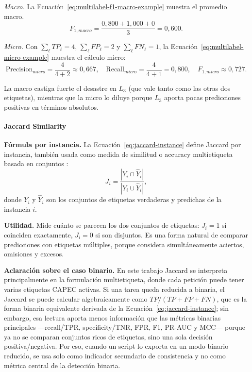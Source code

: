 \documentclass[12pt,oneside]{report}
\begin{document}
\emph{Macro.} La Ecuación~\eqref{eq:multilabel-f1-macro-example} muestra el promedio macro.
\begin{equation}
\label{eq:multilabel-f1-macro-example}
F_{1,macro}=\frac{0{,}800+1{,}000+0}{3}=0{,}600.
\end{equation}

\emph{Micro.} Con $\sum_\ell TP_\ell=4$, $\sum_\ell FP_\ell=2$ y
$\sum_\ell FN_\ell=1$, la Ecuación~\eqref{eq:multilabel-micro-example} muestra el cálculo micro:
\begin{equation}
\label{eq:multilabel-micro-example}
\mathrm{Precision}_{micro}=\frac{4}{4+2}\approx 0{,}667,\quad
\mathrm{Recall}_{micro}=\frac{4}{4+1}=0{,}800,\quad
F_{1,micro}\approx 0{,}727.
\end{equation}

La macro castiga fuerte el desastre en $L_3$ (que vale tanto como las
otras dos etiquetas), mientras que la micro lo diluye porque $L_3$
aporta pocas predicciones positivas en términos absolutos.

\paragraph{Jaccard Similarity}

\textbf{Fórmula por instancia.} La Ecuación~\eqref{eq:jaccard-instance} define Jaccard por instancia, también usada como medida de similitud o accuracy multietiqueta basada en conjuntos \cite{tsoumakas_multilabel_overview,read2011}:
\begin{equation}
\label{eq:jaccard-instance}
J_i = \frac{|Y_i \cap \hat{Y}_i|}{|Y_i \cup \hat{Y}_i|},
\end{equation}
donde $Y_i$ y $\hat{Y}_i$ son los conjuntos de etiquetas verdaderas y
predichas de la instancia $i$.

\textbf{Utilidad.} Mide cuánto se parecen los dos conjuntos de
etiquetas: $J_i=1$ si coinciden exactamente, $J_i=0$ si son disjuntos.
Es una forma natural de comparar predicciones con etiquetas múltiples,
porque considera simultáneamente aciertos, omisiones y excesos.

\textbf{Aclaración sobre el caso binario.} En este trabajo Jaccard se
interpreta principalmente en la formulación multietiqueta, donde cada
petición puede tener varias etiquetas CAPEC activas. Si una tarea queda
reducida a binaria, el Jaccard se puede calcular algebraicamente como
$TP/(TP+FP+FN)$, que es la forma binaria equivalente derivada de la Ecuación~\eqref{eq:jaccard-instance}; sin embargo, esa lectura aporta menos información que las
métricas binarias principales —recall/TPR, specificity/TNR, FPR, F1,
PR-AUC y MCC— porque ya no se comparan conjuntos ricos de etiquetas,
sino una sola decisión positiva/negativa. Por eso, cuando un script
lo exporta en un modo binario reducido, se usa solo como indicador
secundario de consistencia y no como métrica central de la detección
binaria.
\end{document}
